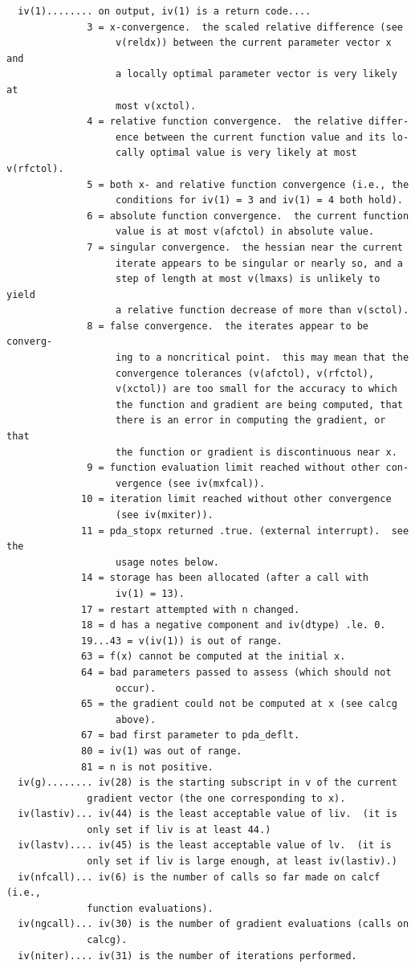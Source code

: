 \documentclass[11pt,twoside]{article}
\begin{document}
\begin{verbatim}
  iv(1)........ on output, iv(1) is a return code....
              3 = x-convergence.  the scaled relative difference (see
                   v(reldx)) between the current parameter vector x and
                   a locally optimal parameter vector is very likely at
                   most v(xctol).
              4 = relative function convergence.  the relative differ-
                   ence between the current function value and its lo-
                   cally optimal value is very likely at most v(rfctol).
              5 = both x- and relative function convergence (i.e., the
                   conditions for iv(1) = 3 and iv(1) = 4 both hold).
              6 = absolute function convergence.  the current function
                   value is at most v(afctol) in absolute value.
              7 = singular convergence.  the hessian near the current
                   iterate appears to be singular or nearly so, and a
                   step of length at most v(lmaxs) is unlikely to yield
                   a relative function decrease of more than v(sctol).
              8 = false convergence.  the iterates appear to be converg-
                   ing to a noncritical point.  this may mean that the
                   convergence tolerances (v(afctol), v(rfctol),
                   v(xctol)) are too small for the accuracy to which
                   the function and gradient are being computed, that
                   there is an error in computing the gradient, or that
                   the function or gradient is discontinuous near x.
              9 = function evaluation limit reached without other con-
                   vergence (see iv(mxfcal)).
             10 = iteration limit reached without other convergence
                   (see iv(mxiter)).
             11 = pda_stopx returned .true. (external interrupt).  see the
                   usage notes below.
             14 = storage has been allocated (after a call with
                   iv(1) = 13).
             17 = restart attempted with n changed.
             18 = d has a negative component and iv(dtype) .le. 0.
             19...43 = v(iv(1)) is out of range.
             63 = f(x) cannot be computed at the initial x.
             64 = bad parameters passed to assess (which should not
                   occur).
             65 = the gradient could not be computed at x (see calcg
                   above).
             67 = bad first parameter to pda_deflt.
             80 = iv(1) was out of range.
             81 = n is not positive.
  iv(g)........ iv(28) is the starting subscript in v of the current
              gradient vector (the one corresponding to x).
  iv(lastiv)... iv(44) is the least acceptable value of liv.  (it is
              only set if liv is at least 44.)
  iv(lastv).... iv(45) is the least acceptable value of lv.  (it is
              only set if liv is large enough, at least iv(lastiv).)
  iv(nfcall)... iv(6) is the number of calls so far made on calcf (i.e.,
              function evaluations).
  iv(ngcall)... iv(30) is the number of gradient evaluations (calls on
              calcg).
  iv(niter).... iv(31) is the number of iterations performed.


\end{verbatim}
\end{document}
